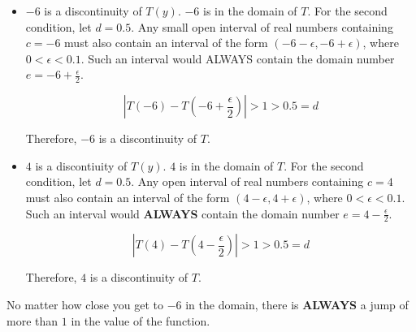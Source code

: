 \documentclass{ximera}
\begin{document}
\begin{example}
\begin{itemize}
\item $-6$ is a discontinuity of $T(y)$.  $-6$ is in the domain of $T$.  For the second condition, let $d = 0.5$. Any small open interval of real numbers containing $c = -6$ must also contain an interval of the form $(-6-\epsilon, -6+\epsilon)$, where $0 < \epsilon < 0.1$.   Such an interval would ALWAYS contain the domain number $e = -6+\frac{\epsilon}{2}$.

\[ \left| T(-6) - T\left(-6+\frac{\epsilon}{2}\right) \right| > 1 > 0.5 = d \]

Therefore, $-6$ is a discontinuity of $T$. 


\item $4$ is a discontiuity of $T(y)$.   $4$ is in the domain of $T$.  For the second condition, let $d = 0.5$. Any open interval of real numbers containing $c = 4$ must also contain an interval of the form $(4-\epsilon, 4+\epsilon)$, where $0 < \epsilon < 0.1$.   Such an interval would \textbf{ALWAYS} contain the domain number $e = 4-\frac{\epsilon}{2}$.

\[ \left| T(4) - T\left(4-\frac{\epsilon}{2}\right) \right| > 1 > 0.5 = d \]

Therefore, $4$ is a discontinuity of $T$. 

\end{itemize}



\end{example}

No matter how close you get to $-6$ in the domain, there is \textbf{ALWAYS} a jump of more than $1$ in the value of the function.  
\end{document}
